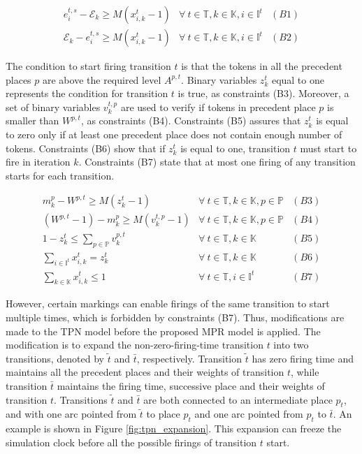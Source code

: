 \documentclass[suppldata]{interact}
\theoremstyle{plain}
\theoremstyle{definition}
\theoremstyle{remark}
\begin{document}
\begin{eqnarray}
	e^{t,s}_i-\mathcal{E}_{k} \ge M(x^{t}_{i,k}-1)& \forall\ t\in \mathbb{T},k\in \mathbb{K},i\in \mathbb{I}^{t}&(B1)\nonumber\\
	\mathcal{E}_{k} -e^{t,s}_i\ge M(x^{t}_{i,k}-1)&\forall\ t\in \mathbb{T},k\in \mathbb{K},i\in \mathbb{I}^{t}&(B2)\nonumber
\end{eqnarray}

The condition to start firing transition $t$ is that the tokens in all the precedent places $p$ are above the required level $A^{p,t}$. Binary variables $z^{t}_{k}$ equal to one represents the condition for transition $t$ is true, as constraints (B3). Moreover, a set of binary variables $v^{t,p}_k$ are used to verify if tokens in precedent place $p$ is smaller than $W^{p,t}$, as constraints (B4). Constraints (B5) assures that $z^{t}_k$ is equal to zero only if at least one precedent place does not contain enough number of tokens. Constraints (B6) show that if $z^{t}_k$ is equal to one, transition $t$ must start to fire in iteration $k$. Constraints (B7) state that at most one firing of any transition starts for each transition.

\begin{eqnarray}
	m^p_k - W^{p,t} \ge M(z^{t}_{k}-1)&\forall\ t\in \mathbb{T},k\in \mathbb{K},p\in \mathbb{P}&(B3)\nonumber\\
	(W^{p,t}-1) - m^p_k \ge M(v^{t,p}_k-1) & \forall\ t\in \mathbb{T},k\in \mathbb{K},p\in \mathbb{P} &(B4)\nonumber\\
	1 - z^{t}_{k} \le \sum_{p\in \mathbb{P}} v^{p,t}_k&\forall\ t\in \mathbb{T},k\in \mathbb{K}&(B5)\nonumber\\
	\sum_{i\in \mathbb{I}^{t}} x^{t}_{i,k} = z^{t}_k&\forall\ t\in \mathbb{T},k\in \mathbb{K}&(B6)\nonumber\\
	\sum_{k\in \mathbb{K}} x^{t}_{i,k} \le 1& \forall\ t\in \mathbb{T},i\in \mathbb{I}^{t}&(B7)\nonumber
\end{eqnarray}

However, certain markings can enable firings of the same transition to start multiple times, which is forbidden by constraints (B7). Thus, modifications are made to the TPN model before the proposed MPR model is applied. The modification is to expand the non-zero-firing-time transition $t$ into two transitions, denoted by $\tilde{t}$ and $\bar{t}$, respectively. Transition $\tilde{t}$ has zero firing time and maintains all the precedent places and their weights of transition $t$, while transition $\bar{t}$ maintains the firing time, successive place and their weights of transition $t$. Transitions $\tilde{t}$ and $\bar{t}$ are both connected to an intermediate place $p_t$, and with one arc pointed from $\tilde{t}$ to place $p_t$ and one arc pointed from $p_t$ to $\bar{t}$. An example is shown in Figure \ref{fig:tpn_expansion}. This expansion can freeze the simulation clock before all the possible firings of transition $t$ start.
\end{document}
